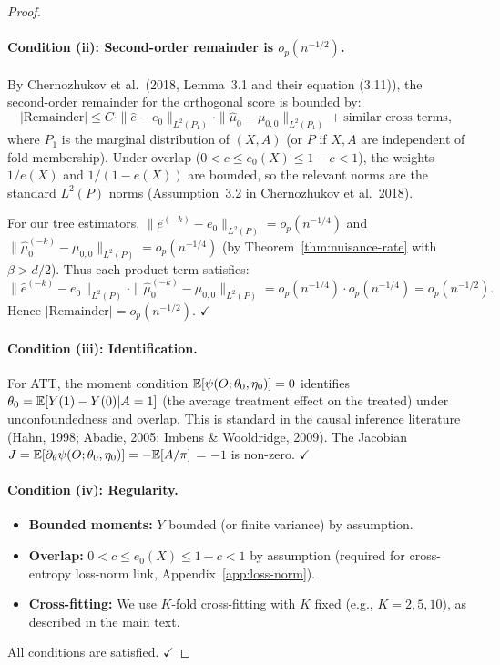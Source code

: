 \documentclass[12pt]{article}
\begin{document}
\begin{proof}
\paragraph{Condition (ii): Second-order remainder is $o_p(n^{-1/2})$.}
By Chernozhukov et al.\ (2018, Lemma~3.1 and their equation (3.11)), the second-order remainder for the orthogonal score is bounded by:
\[
|\text{Remainder}| \le C \cdot \|\hat{e} - e_0\|_{L^2(P_1)} \cdot \|\hat{\mu}_0 - \mu_{0,0}\|_{L^2(P_1)} + \text{similar cross-terms},
\]
where $P_1$ is the marginal distribution of $(X, A)$ (or $P$ if $X, A$ are independent of fold membership). Under overlap ($0 < c \le e_0(X) \le 1-c < 1$), the weights $1/e(X)$ and $1/(1-e(X))$ are bounded, so the relevant norms are the standard $L^2(P)$ norms (Assumption~3.2 in Chernozhukov et al.\ 2018).

For our tree estimators, $\|\hat{e}^{(-k)} - e_0\|_{L^2(P)} = o_p(n^{-1/4})$ and $\|\hat{\mu}_0^{(-k)} - \mu_{0,0}\|_{L^2(P)} = o_p(n^{-1/4})$ (by Theorem~\ref{thm:nuisance-rate} with $\beta > d/2$). Thus each product term satisfies:
\[
\|\hat{e}^{(-k)} - e_0\|_{L^2(P)} \cdot \|\hat{\mu}_0^{(-k)} - \mu_{0,0}\|_{L^2(P)} = o_p(n^{-1/4}) \cdot o_p(n^{-1/4}) = o_p(n^{-1/2}).
\]
Hence $|\text{Remainder}| = o_p(n^{-1/2})$. $\checkmark$

\paragraph{Condition (iii): Identification.}
For ATT, the moment condition $\mathbb{E}[\psi(O; \theta_0, \eta_0)] = 0$ identifies $\theta_0 = \mathbb{E}[Y(1) - Y(0) | A = 1]$ (the average treatment effect on the treated) under unconfoundedness and overlap. This is standard in the causal inference literature (Hahn, 1998; Abadie, 2005; Imbens \& Wooldridge, 2009). The Jacobian $J = \mathbb{E}[\partial_\theta \psi(O; \theta_0, \eta_0)] = -\mathbb{E}[A/\pi]$ = $-1$ is non-zero. $\checkmark$

\paragraph{Condition (iv): Regularity.}
\begin{itemize}
\item \textbf{Bounded moments:} $Y$ bounded (or finite variance) by assumption.
\item \textbf{Overlap:} $0 < c \le e_0(X) \le 1-c < 1$ by assumption (required for cross-entropy loss-norm link, Appendix~\ref{app:loss-norm}).
\item \textbf{Cross-fitting:} We use $K$-fold cross-fitting with $K$ fixed (e.g., $K = 2, 5, 10$), as described in the main text.
\end{itemize}
All conditions are satisfied. $\checkmark$


\end{proof}
\end{document}
